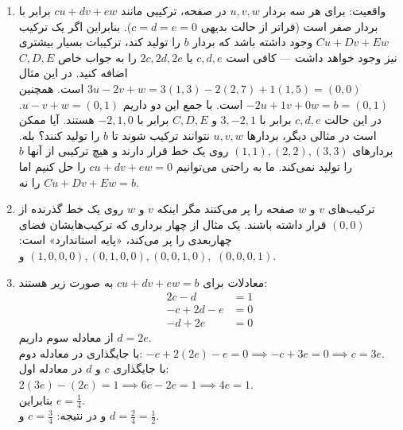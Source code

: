 \documentclass[12pt,a4paper]{article}
\begin{document}
{\begin{enumerate}
			\item واقعیت: برای هر سه بردار $u, v, w$ در صفحه، ترکیبی مانند $cu + dv + ew$ برابر با بردار صفر است (فراتر از حالت بدیهی $c=d=e=0$). بنابراین اگر یک ترکیب $Cu+Dv+Ew$ وجود داشته باشد که بردار $b$ را تولید کند، ترکیبات بسیار بیشتری نیز وجود خواهد داشت — کافی است $c,d,e$ یا $2c,2d,2e$ را به جواب خاص $C,D,E$ اضافه کنید.
			در این مثال $3u - 2v + w = 3(1,3) - 2(2,7) + 1(1,5) = (0,0)$ است. همچنین $-2u+1v+0w = b=(0,1)$ است. با جمع این دو داریم $u-v+w=(0,1)$. در این حالت $c,d,e$ برابر با $3,-2,1$ و $C,D,E$ برابر با $-2,1,0$ هستند.
			آیا ممکن است در مثالی دیگر، بردارها $u, v, w$ نتوانند ترکیب شوند تا $b$ را تولید کنند؟ بله. بردارهای $(1,1), (2,2), (3,3)$ روی یک خط قرار دارند و هیچ ترکیبی از آنها $b$ را تولید نمی‌کند. ما به راحتی می‌توانیم $cu+dv+ew=0$ را حل کنیم اما $Cu+Dv+Ew=b$ را نه.
			
			\item ترکیب‌های $v$ و $w$ صفحه را پر می‌کنند مگر اینکه $v$ و $w$ روی یک خط گذرنده از $(0,0)$ قرار داشته باشند. یک مثال از چهار برداری که ترکیب‌هایشان فضای چهاربعدی را پر می‌کند، «پایه استاندارد» است: $(1,0,0,0), (0,1,0,0), (0,0,1,0),$ و $(0,0,0,1)$.
			
			\item معادلات برای $cu + dv + ew = b$ به صورت زیر هستند:
			\begin{align*}
				2c - d &= 1 \\
				-c + 2d - e &= 0 \\
				-d + 2e &= 0
			\end{align*}
			از معادله سوم داریم $d=2e$. \\
			با جایگذاری در معادله دوم: $-c + 2(2e) - e = 0 \implies -c + 3e = 0 \implies c = 3e$. \\
			با جایگذاری $c$ و $d$ در معادله اول: $2(3e) - (2e) = 1 \implies 6e - 2e = 1 \implies 4e=1$. \\
			بنابراین $e = \frac{1}{4}$. \\
			و در نتیجه: $c = \frac{3}{4}$ و $d = \frac{2}{4} = \frac{1}{2}$.
			
		\end{enumerate}
		
	} %
\end{document}
